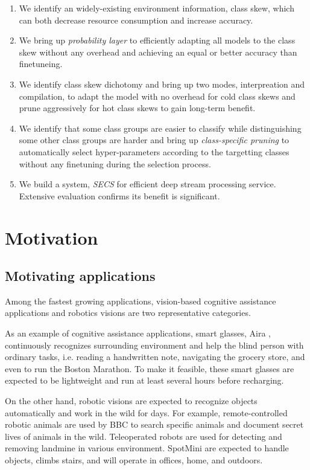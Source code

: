 \documentclass[pageno]{jpaper}
\begin{document}
\begin{enumerate}
  \item We identify an widely-existing environment information, class skew, which can both decrease resource consumption and increase accuracy.
  \item We bring up \textit{probability layer} to efficiently adapting all models to the class skew without any overhead and achieving an equal or better accuracy than finetuneing.
  \item We identify class skew dichotomy and bring up two modes, interpreation and compilation, to adapt the model with no overhead for cold class skews and prune aggressively for hot class skews to gain long-term benefit.
  \item We identify that some class groups are easier to classify while distinguishing some other class groups are harder and bring up \textit{class-specific pruning} to automatically select hyper-parameters according to the targetting classes without any finetuning during the selection process.
  \item We build a system, \textit{SECS} for efficient deep stream processing service. Extensive evaluation confirms its benefit is significant.
\end{enumerate}




\section{Motivation} \label{Motivation}
\subsection{Motivating applications}
Among the fastest growing applications, vision-based cognitive assistance applications and robotics visions are two representative categories.

As an example of cognitive assistance applications, smart glasses, Aira \cite{aria2018}, continuously recognizes surrounding environment and help the blind person with ordinary tasks, i.e. reading a handwritten note, navigating the grocery store, and even to run the Boston Marathon. To make it feasible, these smart glasses are expected to be lightweight and run at least several hours before recharging. 

On the other hand, robotic visions are expected to recognize objects automatically and work in the wild for days. For example, remote-controlled robotic animals are used by BBC \cite{bbc2018} to search specific animals and document secret lives of animals in the wild. Teleoperated robots \cite{landmine2018} are used for detecting and removing landmine in various environment. SpotMini \cite{spot-mini} are expected to handle objects, climbs stairs, and will operate in offices, home, and outdoors.
\end{document}
